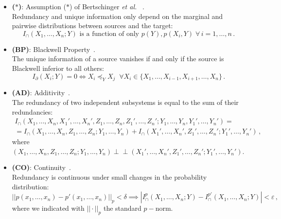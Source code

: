 \documentclass{article}
\makeatletter
\newcommand{\etal}{\textit{et al.\@} }
\newcommand{\ind}{\mathrel{\perp\!\!\!\perp}}
\newcommand{\Xs}{X_1,\ldots,X_n}
\newcommand{\XsY}{X_1,\ldots,X_n;Y}
\newcommand{\Icaps}{\ensuremath{I_\cap(\Xs;Y)}}
\makeatother
\begin{document}
\begin{itemize}
    \item \textbf{($\boldsymbol{\ast}$)}: Assumption ($\ast$) of Bertschinger \etal~\cite{bertschinger2014quantifying}. \\
     Redundancy and unique information only depend on the marginal and pairwise distributions between sources and the target:
    \begin{equation}\label{ax:AST}
        \Icaps \text{ is a function of only } p(Y), p(X_i,Y) \;\forall \,i =1,\ldots,n \,.
    \end{equation}

    \item \textbf{(BP)}: Blackwell Property~\cite{rauh2017extractable, kolchinsky2022novel, venkatesh2022partial}. \\
    The unique information of a source vanishes if and only if the source is Blackwell inferior to all others:
    \begin{equation}\label{ax:BP}
        I_\partial(X_i;Y) =0\iff X_i\preceq_Y X_j \;\;\forall X_i\in\{X_1,\ldots,X_{i-1},X_{i+1},\ldots,X_n\}\,.
    \end{equation}

    \item \textbf{(AD)}: Additivity~\cite{rauh2023continuity}. \\
    The redundancy of two independent subsystems is equal to the sum of their redundancies: 
    \begin{equation}\label{ax:AD}
    \begin{aligned}
        I_\cap(X_1,\ldots, X_n,X_1',\ldots, X_n',Z_1,\ldots, Z_n,Z_1',\ldots, Z_n';Y_1,\ldots, Y_n,Y_1',\ldots, Y_n') = \\
        = I_\cap(X_1,\ldots, X_n,Z_1,\ldots, Z_n;Y_1,\ldots, Y_n)+I_\cap(X_1',\ldots, X_n',Z_1',\ldots, Z_n';Y_1',\ldots, Y_n') \,,
    \end{aligned}
    \end{equation}
    where $(X_1,\ldots, X_n,Z_1,\ldots, Z_n;Y_1,\ldots, Y_n)\ind (X_1',\ldots, X_n',Z_1',\ldots, Z_n';Y_1',\ldots, Y_n')$.

    \item \textbf{(CO)}: Continuity~\cite{rauh2023continuity}. \\
    Redundancy is continuous under small changes in the probability distribution:
    \begin{equation}\label{ax:CO}
        ||p(x_1,\ldots,x_n)-p'(x_1,\ldots,x_n)||_p < \delta \implies  |I^p_\cap(\XsY)-I^{p'}_\cap(\XsY)|<\varepsilon \,,
    \end{equation}
    where we indicated with $||\cdot||_p$ the standard $p-$norm.


\end{itemize}
\end{document}
